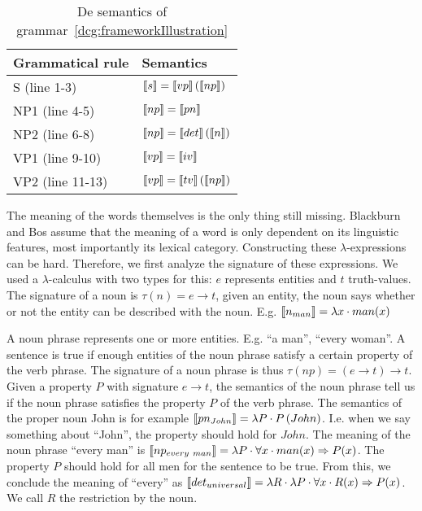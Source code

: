 \begin{table}[h]
  \begin{tabular}{@{}ll}
    \hline
    \textbf{Grammatical rule} & \textbf{Semantics} \\
    \hline
    S (line 1-3) & $\llbracket s \rrbracket = \llbracket vp \rrbracket \left( \llbracket np \rrbracket \right)$ \\
    NP1 (line 4-5) & $\llbracket np \rrbracket = \llbracket pn \rrbracket$ \\
    NP2 (line 6-8) & $\llbracket np \rrbracket = \llbracket det \rrbracket \left( \llbracket n \rrbracket \right)$ \\
    VP1 (line 9-10) & $\llbracket vp \rrbracket = \llbracket iv \rrbracket$ \\
    VP2 (line 11-13) & $\llbracket vp \rrbracket = \llbracket tv \rrbracket \left( \llbracket np \rrbracket \right)$\\
    \hline
  \end{tabular}
  \centering
  \caption{De semantics of grammar~\ref{dcg:frameworkIllustration}}
  \label{tbl:grammar-sem}
\end{table}

The meaning of the words themselves is the only thing still missing. Blackburn and Bos assume that the meaning of a word is only dependent on its linguistic features, most importantly its lexical category. Constructing these $\lambda$-expressions can be hard. Therefore, we first analyze the signature of these expressions. We used a $\lambda$-calculus with two types for this: $e$ represents entities and $t$ truth-values. The signature of a noun is $\tau(n) = e \rightarrow t$, given an entity, the noun says whether or not the entity can be described with the noun. E.g. $\llbracket n_{man} \rrbracket = \lambda x \cdot man(x)$

A noun phrase represents one or more entities. E.g. ``a man'', ``every woman''. A sentence is true if enough entities of the noun phrase satisfy a certain property of the verb phrase. The signature of a noun phrase is thus $\tau(np) = (e \rightarrow t) \rightarrow t$. Given a property $P$ with signature $e \rightarrow t$, the semantics of the noun phrase tell us if the noun phrase satisfies the property $P$ of the verb phrase. The semantics of the proper noun John is for example $\llbracket pn_{John} \rrbracket = \lambda P \cdot P \left( John \right)$. I.e. when we say something about ``John'', the property should hold for $John$. The meaning of the noun phrase ``every man'' is $\llbracket np_{every\ man} \rrbracket = \lambda P \cdot \forall x \cdot man(x) \Rightarrow P(x)$. The property $P$ should hold for all men for the sentence to be true. From this, we conclude the meaning of ``every'' as $\llbracket det_{universal} \rrbracket = \lambda R \cdot \lambda P \cdot \forall x \cdot R(x) \Rightarrow P(x)$. We call $R$ the restriction by the noun.

